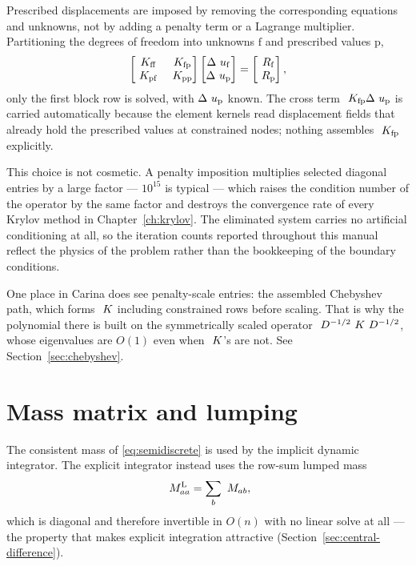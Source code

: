 Prescribed displacements are imposed by removing the corresponding equations
and unknowns, not by adding a penalty term or a Lagrange multiplier.
Partitioning the degrees of freedom into unknowns $\mathrm{f}$ and prescribed
values $\mathrm{p}$,
\begin{equation}
  \begin{bmatrix}
    ~K_{\mathrm{ff}} & ~K_{\mathrm{fp}} \\
    ~K_{\mathrm{pf}} & ~K_{\mathrm{pp}}
  \end{bmatrix}
  \begin{bmatrix} \Delta~u_{\mathrm{f}} \\ \Delta~u_{\mathrm{p}} \end{bmatrix}
  =
  \begin{bmatrix} ~R_{\mathrm{f}} \\ ~R_{\mathrm{p}} \end{bmatrix},
\end{equation}
only the first block row is solved, with $\Delta~u_{\mathrm{p}}$ known.  The
cross term $~K_{\mathrm{fp}}\Delta~u_{\mathrm{p}}$ is carried
automatically because the element kernels read displacement fields that already
hold the prescribed values at constrained nodes; nothing assembles
$~K_{\mathrm{fp}}$ explicitly.

This choice is not cosmetic.  A penalty imposition multiplies selected
diagonal entries by a large factor --- $10^{15}$ is typical --- which raises
the condition number of the operator by the same factor and destroys the
convergence rate of every Krylov method in Chapter~\ref{ch:krylov}.  The
eliminated system carries no artificial conditioning at all, so the iteration
counts reported throughout this manual reflect the physics of the problem
rather than the bookkeeping of the boundary conditions.

\begin{remark}
One place in Carina does see penalty-scale entries: the assembled Chebyshev
path, which forms $~K$ including constrained rows before scaling.  That is
why the polynomial there is built on the symmetrically scaled operator
$~D^{-1/2}~K~D^{-1/2}$, whose eigenvalues are $O(1)$ even when
$~K$'s are not.  See Section~\ref{sec:chebyshev}.
\end{remark}

\section{Mass matrix and lumping}

The consistent mass of \eqref{eq:semidiscrete} is used by the implicit dynamic
integrator.  The explicit integrator instead uses the row-sum lumped mass
\begin{equation}
  ~M^{\mathrm{L}}_{aa} = \sum_b ~M_{ab},
\end{equation}
which is diagonal and therefore invertible in $O(n)$ with no linear solve at
all --- the property that makes explicit integration attractive
(Section~\ref{sec:central-difference}).
